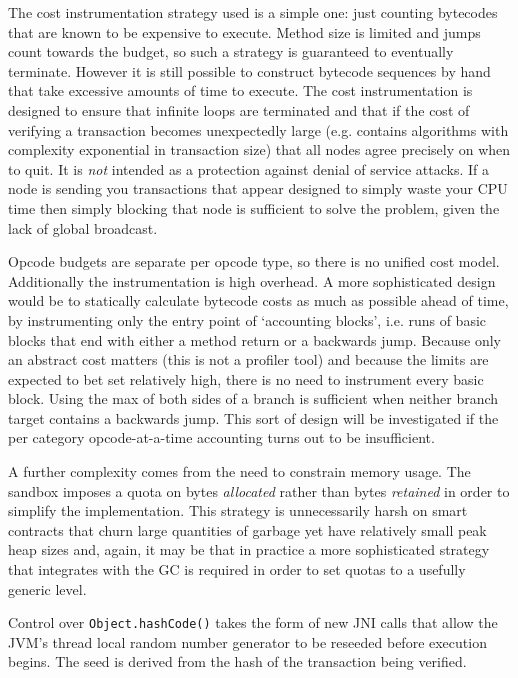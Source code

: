 \documentclass{article}
\begin{document}
The cost instrumentation strategy used is a simple one: just counting bytecodes that are known to be expensive to execute.
Method size is limited and jumps count towards the budget, so such a strategy is guaranteed to eventually terminate. However
it is still possible to construct bytecode sequences by hand that take excessive amounts of time to execute. The cost
instrumentation is designed to ensure that infinite loops are terminated and that if the cost of verifying a transaction
becomes unexpectedly large (e.g. contains algorithms with complexity exponential in transaction size) that all nodes agree
precisely on when to quit. It is \emph{not} intended as a protection against denial of service attacks. If a node is sending
you transactions that appear designed to simply waste your CPU time then simply blocking that node is sufficient to solve
the problem, given the lack of global broadcast.

Opcode budgets are separate per opcode type, so there is no unified cost model. Additionally the instrumentation is high
overhead. A more sophisticated design would be to statically calculate bytecode costs as much as possible ahead of time,
by instrumenting only the entry point of `accounting blocks', i.e. runs of basic blocks that end with either a method return
or a backwards jump. Because only an abstract cost matters (this is not a profiler tool) and because the limits are expected
to bet set relatively high, there is no need to instrument every basic block. Using the max of both sides of a branch is
sufficient when neither branch target contains a backwards jump. This sort of design will be investigated if the per category
opcode-at-a-time accounting turns out to be insufficient.

A further complexity comes from the need to constrain memory usage. The sandbox imposes a quota on bytes \emph{allocated}
rather than bytes \emph{retained} in order to simplify the implementation. This strategy is unnecessarily harsh on smart
contracts that churn large quantities of garbage yet have relatively small peak heap sizes and, again, it may be that
in practice a more sophisticated strategy that integrates with the GC is required in order to set quotas to a usefully
generic level.

Control over \texttt{Object.hashCode()} takes the form of new JNI calls that allow the JVM's thread local random number
generator to be reseeded before execution begins. The seed is derived from the hash of the transaction being verified.
\end{document}
